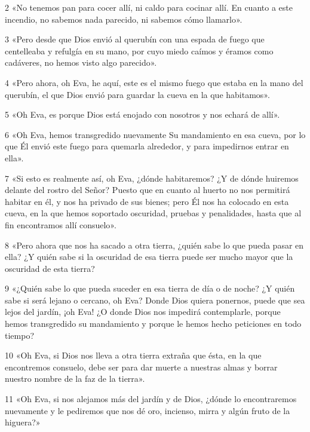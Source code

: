 \par 2 «No tenemos pan para cocer allí, ni caldo para cocinar allí. En cuanto a este incendio, no sabemos nada parecido, ni sabemos cómo llamarlo».

\par 3 «Pero desde que Dios envió al querubín con una espada de fuego que centelleaba y refulgía en su mano, por cuyo miedo caímos y éramos como cadáveres, no hemos visto algo parecido».

\par 4 «Pero ahora, oh Eva, he aquí, este es el mismo fuego que estaba en la mano del querubín, el que Dios envió para guardar la cueva en la que habitamos».

\par 5 «Oh Eva, es porque Dios está enojado con nosotros y nos echará de allí».

\par 6 «Oh Eva, hemos transgredido nuevamente Su mandamiento en esa cueva, por lo que Él envió este fuego para quemarla alrededor, y para impedirnos entrar en ella».

\par 7 «Si esto es realmente así, oh Eva, ¿dónde habitaremos? ¿Y de dónde huiremos delante del rostro del Señor? Puesto que en cuanto al huerto no nos permitirá habitar en él, y nos ha privado de sus bienes; pero Él nos ha colocado en esta cueva, en la que hemos soportado oscuridad, pruebas y penalidades, hasta que al fin encontramos allí consuelo».

\par 8 «Pero ahora que nos ha sacado a otra tierra, ¿quién sabe lo que pueda pasar en ella? ¿Y quién sabe si la oscuridad de esa tierra puede ser mucho mayor que la oscuridad de esta tierra?

\par 9 «¿Quién sabe lo que pueda suceder en esa tierra de día o de noche? ¿Y quién sabe si será lejano o cercano, oh Eva? Donde Dios quiera ponernos, puede que sea lejos del jardín, ¡oh Eva! ¿O donde Dios nos impedirá contemplarle, porque hemos transgredido su mandamiento y porque le hemos hecho peticiones en todo tiempo?

\par 10 «Oh Eva, si Dios nos lleva a otra tierra extraña que ésta, en la que encontremos consuelo, debe ser para dar muerte a nuestras almas y borrar nuestro nombre de la faz de la tierra».

\par 11 «Oh Eva, si nos alejamos más del jardín y de Dios, ¿dónde lo encontraremos nuevamente y le pediremos que nos dé oro, incienso, mirra y algún fruto de la higuera?»

